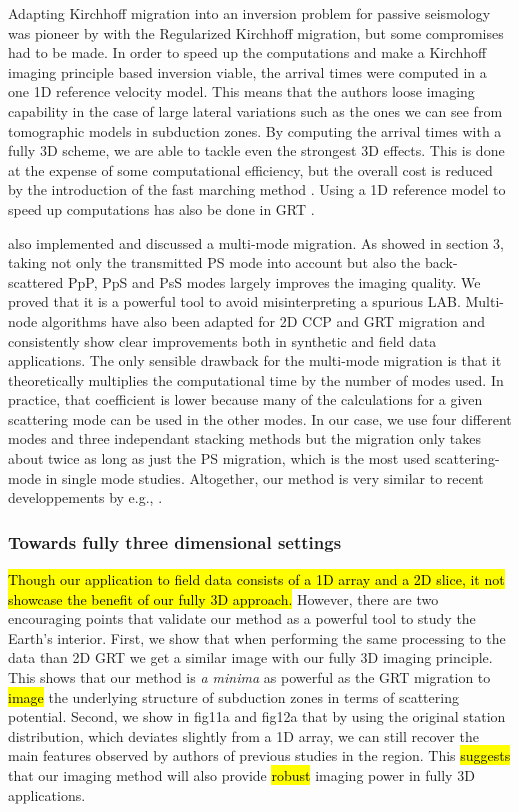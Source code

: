 \documentclass[10pt,a4paper]{article}
\begin{document}
Adapting Kirchhoff migration into an inversion problem for passive seismology was pioneer by \citet{wils_jgr_05} with the Regularized Kirchhoff migration, but some compromises had to be made.
In order to speed up the computations and make a Kirchhoff imaging principle based inversion viable, the arrival times were computed in a one 1D reference velocity model.
This means that the authors loose imaging capability in the case of large lateral variations such as the ones we can see from tomographic models in subduction zones.
By computing the arrival times with a fully 3D scheme, we are able to tackle even the strongest 3D effects.
This is done at the expense of some computational efficiency, but the overall cost is reduced by the introduction of the fast marching method \citep[FM3D,][]{deko_gji_06}.
Using a 1D reference model to speed up computations has also be done in GRT \citep{wang_jgr_16}.

\citet{wils_jgr_05} also implemented and discussed a multi-mode migration.
As showed in section 3, taking not only the transmitted PS mode into account but also the back-scattered PpP, PpS and PsS modes largely improves the imaging quality.
We proved that it is a powerful tool to avoid misinterpreting a spurious LAB.
Multi-node algorithms have also been adapted for 2D CCP \citep{tauz_epsl_16} and GRT migration \citep{bost_jgr_01} and consistently show clear improvements both in synthetic and field data applications.
The only sensible drawback for the multi-mode migration is that it theoretically multiplies the computational time by the number of modes used.
In practice, that coefficient is lower because many of the calculations for a given scattering mode can be used in the other modes.
In our case, we use four different modes and three independant stacking methods but the migration only takes about twice as long as just the PS migration, which is the most used scattering-mode in single mode studies.
Altogether, our method is very similar to recent developpements by e.g., \citet{hans_ggg_17}.

\subsubsection{Towards fully three dimensional settings}

\hl{Though our application to field data consists of a 1D array and a 2D slice, it not showcase the benefit of our fully 3D approach.}
However, there are two encouraging points that validate our method as a powerful tool to study the Earth’s interior.
First, we show that when performing the same processing to the data than 2D GRT we get a similar image with our fully 3D imaging principle.
This shows that our method is {\textit{a minima}} as powerful as the GRT migration to \hl{image} the underlying structure of subduction zones in terms of scattering potential.
Second, we show in fig11a and fig12a that by using the original station distribution, which deviates slightly from a 1D array, we can still recover the main features observed by authors of previous studies in the region.
This \hl{suggests} that our imaging method will also provide \hl{robust} imaging power in fully 3D applications. 
\end{document}
